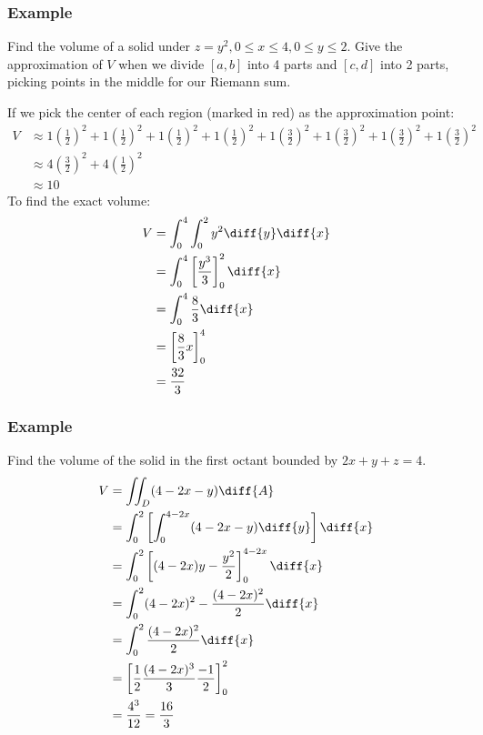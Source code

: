 \documentclass{math}
\begin{document}
\subsubsection*{Example}
Find the volume of a solid under \( z = y^2, 0\le x\le4, 0\le y\le2 \). Give
the approximation of \( V \) when we divide \( [a,b] \) into 4 parts and
\( [c,d] \) into 2 parts, picking points in the middle for our Riemann sum.
\begin{center}
\end{center}
If we pick the center of each region (marked in red) as the approximation point:
\begin{align*}
  V &\approx
    1(\frac{1}{2})^2+1(\frac{1}{2})^2+1(\frac{1}{2})^2+1(\frac{1}{2})^2+
    1(\frac{3}{2})^2+1(\frac{3}{2})^2+1(\frac{3}{2})^2+1(\frac{3}{2})^2 \\
  &\approx 4(\frac{3}{2})^2+4(\frac{1}{2})^2 \\
  &\approx 10
\end{align*}
To find the exact volume:
\begin{align*}
  V &= \int_{0}^{4}\int_{0}^{2}y^2\diff{y}\diff{x} \\
  &= \int_{0}^{4}\left[\frac{y^3}{3}\right]_0^2\diff{x} \\
  &= \int_{0}^{4}\frac{8}{3}\diff{x} \\
  &= \left[\frac{8}{3}x\right]_0^4 \\
  &= \frac{32}{3}
\end{align*}

\subsubsection*{Example}
Find the volume of the solid in the first octant bounded by \( 2x+y+z = 4 \).
\begin{align*}
  V &= \iint_{D}(4-2x-y)\diff{A} \\
  &= \int_{0}^{2}\left[\int_{0}^{4-2x}(4-2x-y)\diff{y}\right]\diff{x} \\
  &= \int_{0}^{2}\left[(4-2x)y-\frac{y^2}{2}\right]_0^{4-2x}\diff{x} \\
  &= \int_{0}^{2}(4-2x)^2-\frac{(4-2x)^2}{2}\diff{x} \\
  &= \int_{0}^{2}\frac{(4-2x)^2}{2}\diff{x} \\
  &= \left[\frac{1}{2}\frac{(4-2x)^3}{3}\frac{-1}{2}\right]_{0}^{2} \\
  &= \frac{4^3}{12} = \frac{16}{3}
\end{align*}
\end{document}
